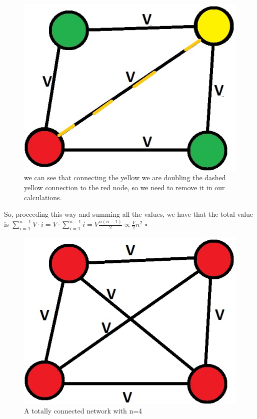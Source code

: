 \documentclass[12pt, a4page]{article}
\begin{document}
\begin{figure}[htp]
\centering
\includegraphics[scale=0.95]{IMAGE3.jpg}
\caption{we can see that connecting the yellow we are doubling the dashed yellow connection to the red node, so we need to remove it in our calculations.}
\label{IMAGE3}
\end{figure} \newline
So, proceeding this way and summing all the values, we have that the total value is $\sum_{i=1}^{n-1} V \cdot i = V \cdot \sum_{i=1}^{n-1} i = V \frac{n(n-1)}{2} \propto \frac{V}{2} n^2$  \hfill $\square$
\newline \begin{figure}[htp]
\centering
\includegraphics[scale=1.00]{IMAGE4.jpg}
\caption{A totally connected network with n=4}
\label{IMAGE4}
\end{figure} \newline
\end{document}
